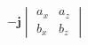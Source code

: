 \documentclass[preview]{standalone}
\begin{document}
\begin{align*}
-\mathbf{j} \begin{vmatrix} a_x & a_z \\ b_x & b_z \end{vmatrix}
\end{align*}
\end{document}

